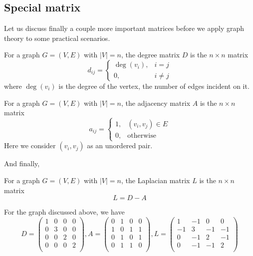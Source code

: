 \documentclass[11pt]{article}
\begin{document}
\subsection{Special matrix}
Let us discuss finally a couple more important matrices before we apply graph theory to some practical scenarios.

\begin{definition}
  For a graph \(G=(V,E)\) with \(|V|=n\), the degree matrix \(D\) is the \(n\times n\) matrix
  \[d_{ij}=\begin{cases}
    \deg(v_i),& i=j\\
    0,& i\neq j
  \end{cases}\]
  where \(\deg(v_i)\) is the degree of the vertex, the number of edges incident on it.
\end{definition}

\begin{definition}
  For a graph \(G=(V,E)\) with \(|V|=n\), the adjacency matrix \(A\) is the \(n\times n\) matrix
  \[a_{ij}=\begin{cases}
    1,& (v_i,v_j)\in E\\
    0,& \text{otherwise} 
  \end{cases}\]
  Here we consider \((v_i,v_j)\) as an unordered pair.
\end{definition}

And finally,
\begin{definition}
  For a graph \(G=(V,E)\) with \(|V|=n\), the Laplacian matrix \(L\) is the \(n\times n\) matrix
  \[L=D-A\]
\end{definition}

For the graph discussed above, we have
\[D=\begin{pmatrix}
  1 & 0 & 0 & 0 \\
  0 & 3 & 0 & 0 \\
  0 & 0 & 2 & 0 \\
  0 & 0 & 0 & 2 \\
\end{pmatrix}, A=\begin{pmatrix}
  0 & 1 & 0 & 0 \\
  1 & 0 & 1 & 1 \\
  0 & 1 & 0 & 1 \\
  0 & 1 & 1 & 0 \\
\end{pmatrix}, L=\begin{pmatrix}
  1 & -1 & 0 & 0 \\
  -1 & 3 & -1 & -1 \\
  0 & -1 & 2 & -1 \\
  0 & -1 & -1 & 2 \\
\end{pmatrix}\]
\end{document}
